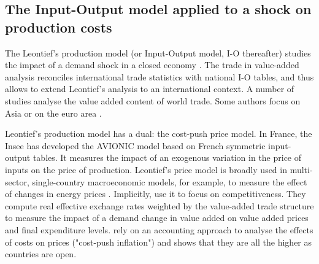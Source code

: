 \documentclass[11pt,a4paper]{article}
\begin{document}
\subsection{The Input-Output model applied to a shock on production costs} 
\label{subsec:io}
The Leontief's production model (or Input-Output model, I-O thereafter) studies the impact of a demand shock in a closed economy \citep{Leontief1951}. 
The trade in value-added analysis reconciles international trade statistics with national I-O tables, and thus allows to extend Leontief's analysis to an international context.
A number of studies \citep{Hummels2001,Daudin2006,Daudin2011, DeBacker2012,Johnson2012,Koopman2014, Amador2015,Los2016} analyse the value added content of world trade. Some authors focus on Asia \citep{Sato2014} or on the euro area \citep{Cappariello2015}.

Leontief's production model has a dual: the cost-push price model.
In France, the Insee \citep{Bourgeois2019} has developed the AVIONIC model based on French symmetric input-output tables. 
It measures the impact of an exogenous variation in the price of inputs on the price of production.
Leontief's price model is broadly used in multi-sector, single-country macroeconomic models, for example, to measure the effect of changes in energy prices \citep{Bournay2015, Sharify2013}. Implicitly, \cite{Bems2015} use it to focus on competitiveness. 
They compute real effective exchange rates weighted by the value-added trade structure to measure the impact of a demand change in value added on value added prices and final expenditure levels. %
\cite{Cochard2016} rely on an accounting approach to analyse the effects of costs on prices ("cost-push inflation") and shows that they are all the higher as countries are open.
\end{document}
